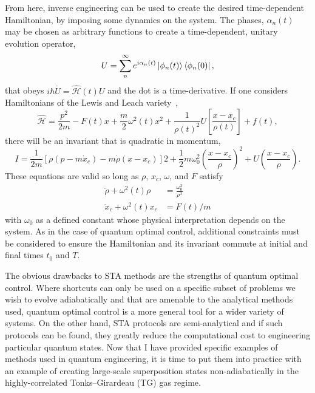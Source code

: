 From here, inverse engineering can be used to create the desired time-dependent Hamiltonian, by imposing some dynamics on the system.
The phases, $\alpha_n(t)$ may be chosen as arbitrary functions to create a time-dependent, unitary evolution operator,
\begin{equation}
U = \sum_n^\infty e^{i\alpha_n(t)}\ket{\phi_n(t)}\bra{\phi_n(0)},
\end{equation}
\noindent that obeys $i\hbar \dot U = \mathcal{\hat H}(t)U$ and the dot is a time-derivative.
If one considers Hamiltonians of the Lewis and Leach variety~\cite{lewis1982},
\begin{equation}
\mathcal{\hat H} = \frac{p^2}{2m}  -F(t)x + \frac{m}{2}\omega^2(t)x^2 + \frac{1}{\rho(t)^2}U\left[\frac{x-x_c}{\rho(t)}\right] + f(t),
\label{eqn:HSTA}
\end{equation}
there will be an invariant that is quadratic in momentum,
\begin{equation}
I = \frac{1}{2m}[\rho(p-m\dot x_c)-m\dot \rho(x-x_c)]2 + \frac{1}{2}m\omega_0^2\left( \frac{x-x_c}{\rho} \right)^2 + U\left( \frac{x-x_c}{\rho}\right).
\end{equation}
\noindent These equations are valid so long as $\rho$, $x_c$, $\omega$, and $F$ satisfy
\begin{align}
\ddot \rho + \omega^2(t)\rho &= \frac{\omega_0^2}{\rho^3} \label{eqn:rho}\\
\ddot x_c + \omega^2(t)x_c &= F(t)/m \label{eqn:xc}
\end{align}
\noindent with $\omega_0$ as a defined constant whose physical interpretation depends on the system.
As in the case of quantum optimal control, additional constraints must be considered to ensure the Hamiltonian and its invariant commute at initial and final times $t_0$ and $T$.

The obvious drawbacks to STA methods are the strengths of quantum optimal control.
Where shortcuts can only be used on a specific subset of problems we wish to evolve adiabatically and that are amenable to the analytical methods used, quantum optimal control is a more general tool for a wider variety of systems.
On the other hand, STA protocols are semi-analytical and if such protocols can be found, they greatly reduce the computational cost to engineering particular quantum states.
Now that I have provided specific examples of methods used in quantum engineering, it is time to put them into practice with an example of creating large-scale superposition states non-adiabatically in the highly-correlated Tonks--Girardeau (TG) gas regime.

